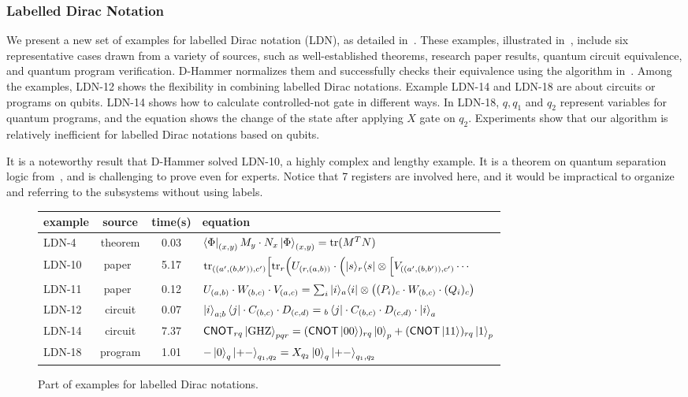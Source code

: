 \subsubsection{Labelled Dirac Notation}
We present a new set of examples for labelled Dirac notation (LDN), as detailed in~. These examples, illustrated in~, include six representative cases drawn from a variety of sources, such as well-established theorems, research paper results, quantum circuit equivalence, and quantum program verification.
D-Hammer normalizes them and successfully checks their equivalence using the algorithm in~.
Among the examples, LDN-12 shows the flexibility in combining labelled Dirac notations.
Example LDN-14 and LDN-18 are about circuits or programs on qubits. LDN-14 shows how to calculate controlled-not gate in different ways. In LDN-18, $q, q_1$ and $q_2$ represent variables for quantum programs, and the equation shows the change of the state after applying $X$ gate on $q_2$. Experiments show that our algorithm is relatively inefficient for labelled Dirac notations based on qubits.

It is a noteworthy result that D-Hammer solved LDN-10, a highly complex and lengthy example. It is a theorem on quantum separation logic from~\cite{DBLP:conf/lics/ZhouBHYY21}, and is challenging to prove even for experts. Notice that 7 registers are involved here, and it would be impractical to organize and referring to the subsystems without using labels.

\begin{figure}[h]
    \center
    \setlength{\extrarowheight}{2pt}
    \begin{tabular}{l c c l}
        \hline
        example & source & time(s) & equation \\
        \hline
        LDN-4 & theorem & 0.03 & \( \bra{\Phi}_{(x, y)} M_y \cdot N_x \ket{\Phi}_{(x, y)} = \mathrm{tr}(M^T N) \) \\
        LDN-10 & paper~\cite{DBLP:conf/lics/ZhouBHYY21} & 5.17 & \( \mathrm{tr}_{((a',(b,b')),c')}\Big[\mathrm{tr}_{r}\Big(U_{(r,(a,b))} \cdot\Big(|s\rangle_r\langle s|\otimes 
        \Big[V_{((a',(b,b')),c')} \cdots \)\\
        LDN-11 & paper~\cite{PALSBERG2024206} & 0.12 & \( U_{(a,b)}\cdot W_{(b,c)}\cdot V_{(a,c)} = 
        \sum_i |i\rangle_a\langle i|\otimes \big((P_i)_c\cdot W_{(b,c)}\cdot (Q_i)_c\big)\) \\
        LDN-12 & circuit & 0.07 & \( \ket{i}_{a;b}\bra{j} \cdot C_{(b,c)} \cdot D_{(c,d)} = {}_b\bra{j} \cdot C_{(b,c)} \cdot D_{(c,d)} \cdot \ket{i}_{a}\) \\
        LDN-14 & circuit & 7.37 & \scriptsize{\( \textsf{CNOT}_{rq}\ket{\textrm{GHZ}}_{pqr} = (\textsf{CNOT}\ket{00})_{rq}\ket{0}_p + (\textsf{CNOT}\ket{11})_{rq}\ket{1}_p \)} \\
        LDN-18 & program & 1.01 & \( -\ket{0}_q\ket{+-}_{q_1, q_2} = X_{q_2} \ket{0}_q\ket{+-}_{q_1, q_2} \) \\
        \hline
    \end{tabular}
    \caption{Part of examples for labelled Dirac notations.}
    \label{fig: labelled examples}
\end{figure}